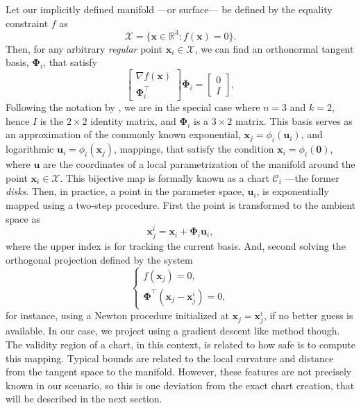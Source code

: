 Let our implicitly defined manifold ---or surface--- be defined by the equality constraint $f$ as
\begin{equation}
\mathcal{X} = \{\mathbf{x} \in \mathbb{R}^3 : f(\mathbf{x}) = 0 \}.
\end{equation}
Then, for any arbitrary \emph{regular} point $\mathbf{x}_i \in \mathcal{X}$, we can find an orthonormal tangent basis, $\boldsymbol{\Phi}_i$, that satisfy
\begin{equation}
\begin{bmatrix} \nabla f(\mathbf{x}) \\ \boldsymbol{\Phi}_i^\top \end{bmatrix} \boldsymbol{\Phi}_i = \begin{bmatrix}  0 \\ I \end{bmatrix},
\end{equation}
Following the notation by \citet{Porta2014CuikSuite}, we are in the special case where $n=3$ and $k=2$, hence $I$ is the $2\times2$ identity matrix, and $\boldsymbol{\Phi}_i$ is a $3\times2$ matrix. This basis serves as an approximation of the commonly known exponential, $\mathbf{x}_j = \phi_i(\mathbf{u}_i)$, and logarithmic $\mathbf{u}_i = \phi_i(\mathbf{x}_j)$, mappings, that satisfy the condition $\mathbf{x}_i = \phi_i(\mathbf{0})$, where $\mathbf{u}$ are the coordinates of a local parametrization of the manifold around the point $\mathbf{x}_i \in \mathcal{X}$. This bijective map is formally known as a chart $\mathcal{C}_i$ ---the former \emph{disks}. Then, in practice, a point in the parameter space, $\mathbf{u}_i$, is exponentially mapped using a two-step procedure. First the point is transformed to the ambient space as
\begin{equation}
  \mathbf{x}_j^i = \mathbf{x}_i + \boldsymbol{\Phi}_i \mathbf{u}_i,
\end{equation}
where the upper index is for tracking the current basis. And, second solving the orthogonal projection defined by the system
\begin{equation}
\begin{cases}
f(\mathbf{x}_j) = 0,
\\ 
\boldsymbol{\Phi}^\top( \mathbf{x}_j - \mathbf{x}_j^i ) = 0,
\end{cases}
\end{equation}
for instance, using a Newton procedure initialized at $\mathbf{x}_j = \mathbf{x}_j^i$, if no better guess is available. In our case, we project using a gradient descent like method though. The validity region of a chart, in this context, is related to how safe is to compute this mapping. Typical bounds are related to the local curvature and distance from the tangent space to the manifold. However, these features are not precisely known in our scenario, so this is one deviation from the exact chart creation, that will be described in the next section. 

